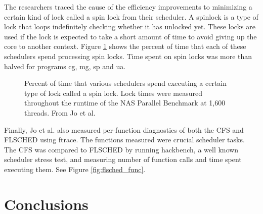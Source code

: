 \documentclass{sig-alternate}
\begin{document}
The researchers traced the cause of the efficiency improvements to minimizing a certain kind of lock called a spin lock from their scheduler. A spinlock is a type of lock that loops indefinitely checking whether it has unlocked yet. These locks are used if the lock is expected to take a short amount of time to avoid giving up the core to another context. Figure \ref{fig:flsched_spinlock} shows the percent of time that each of these schedulers spend processing spin locks. Time spent on spin locks was more than halved for programs cg, mg, sp and ua. \cite{Jo:2017}

\begin{figure}
\centering
{}
\caption{ Percent of time that various schedulers spend executing a certain type of lock called a spin lock. Lock times were measured throughout the runtime of the NAS Parallel Benchmark at 1,600 threads. From Jo et al.~\cite{Jo:2017}}
\label{fig:flsched_spinlock}
\end{figure}

Finally, Jo et al. also measured per-function diagnostics of both the CFS and FLSCHED using ftrace. The functions measured were crucial scheduler tasks. The CFS was compared to FLSCHED by running hackbench, a well known scheduler stress test, and measuring number of function calls and time spent executing them. See Figure \ref{fig:flsched_func}.\cite{Jo:2017}

\begin{figure*}
\centering
{}
\caption{Average time and function call counts for critical scheduler tasks. The numbers were gathered using ftrace while running the hackbench stress test for thread schedulers. From Jo et al.~\cite{Jo:2017}}
\label{fig:flsched_func}
\end{figure*}


\section{Conclusions}
\label{sec:conclusions}
\end{document}
